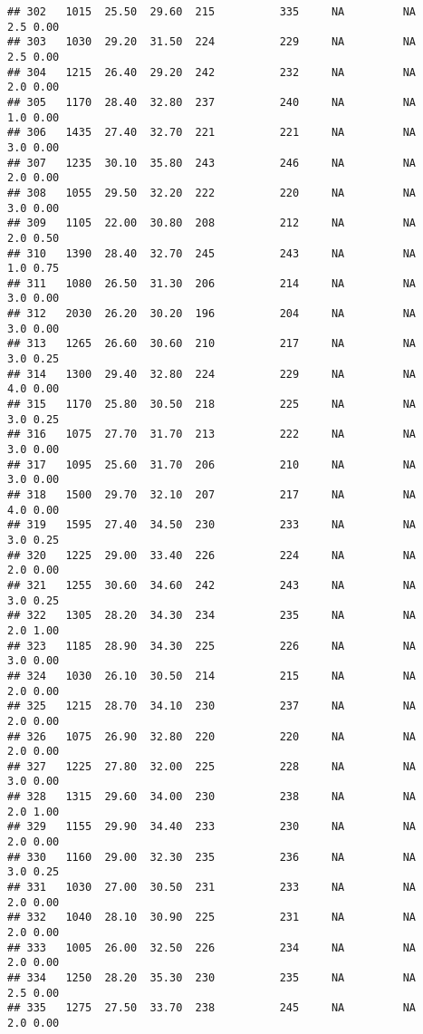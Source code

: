 \documentclass[
]{article}
\begin{document}
\begin{verbatim}
## 302   1015  25.50  29.60  215          335     NA         NA     2.5 0.00
## 303   1030  29.20  31.50  224          229     NA         NA     2.5 0.00
## 304   1215  26.40  29.20  242          232     NA         NA     2.0 0.00
## 305   1170  28.40  32.80  237          240     NA         NA     1.0 0.00
## 306   1435  27.40  32.70  221          221     NA         NA     3.0 0.00
## 307   1235  30.10  35.80  243          246     NA         NA     2.0 0.00
## 308   1055  29.50  32.20  222          220     NA         NA     3.0 0.00
## 309   1105  22.00  30.80  208          212     NA         NA     2.0 0.50
## 310   1390  28.40  32.70  245          243     NA         NA     1.0 0.75
## 311   1080  26.50  31.30  206          214     NA         NA     3.0 0.00
## 312   2030  26.20  30.20  196          204     NA         NA     3.0 0.00
## 313   1265  26.60  30.60  210          217     NA         NA     3.0 0.25
## 314   1300  29.40  32.80  224          229     NA         NA     4.0 0.00
## 315   1170  25.80  30.50  218          225     NA         NA     3.0 0.25
## 316   1075  27.70  31.70  213          222     NA         NA     3.0 0.00
## 317   1095  25.60  31.70  206          210     NA         NA     3.0 0.00
## 318   1500  29.70  32.10  207          217     NA         NA     4.0 0.00
## 319   1595  27.40  34.50  230          233     NA         NA     3.0 0.25
## 320   1225  29.00  33.40  226          224     NA         NA     2.0 0.00
## 321   1255  30.60  34.60  242          243     NA         NA     3.0 0.25
## 322   1305  28.20  34.30  234          235     NA         NA     2.0 1.00
## 323   1185  28.90  34.30  225          226     NA         NA     3.0 0.00
## 324   1030  26.10  30.50  214          215     NA         NA     2.0 0.00
## 325   1215  28.70  34.10  230          237     NA         NA     2.0 0.00
## 326   1075  26.90  32.80  220          220     NA         NA     2.0 0.00
## 327   1225  27.80  32.00  225          228     NA         NA     3.0 0.00
## 328   1315  29.60  34.00  230          238     NA         NA     2.0 1.00
## 329   1155  29.90  34.40  233          230     NA         NA     2.0 0.00
## 330   1160  29.00  32.30  235          236     NA         NA     3.0 0.25
## 331   1030  27.00  30.50  231          233     NA         NA     2.0 0.00
## 332   1040  28.10  30.90  225          231     NA         NA     2.0 0.00
## 333   1005  26.00  32.50  226          234     NA         NA     2.0 0.00
## 334   1250  28.20  35.30  230          235     NA         NA     2.5 0.00
## 335   1275  27.50  33.70  238          245     NA         NA     2.0 0.00

\end{verbatim}
\end{document}

